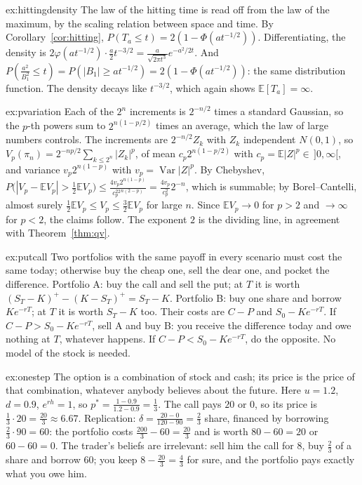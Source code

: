 \begin{solution}{ex:hittingdensity}
\idea The law of the hitting time is read off from the law of the maximum, by the scaling relation between space and
time.
\writeup By Corollary~\ref{cor:hitting}, $P(T_a\le t)=2(1-\Phi(at^{-1/2}))$. Differentiating, the density is $2\varphi(at^{-1/2})\cdot\frac a2t^{-3/2}=\frac a{\sqrt{2\pi t^3}}e^{-a^2/2t}$. And
$P(\frac{a^2}{B_1^2}\le t)=P(|B_1|\ge at^{-1/2})=2(1-\Phi(at^{-1/2}))$: the same distribution function. The density decays like $t^{-3/2}$, which again shows $\mathbb E[T_a]=\infty$.
\end{solution}

\begin{solution}{ex:pvariation}
\idea Each of the $2^n$ increments is $2^{-n/2}$ times a standard Gaussian, so the $p$-th powers sum to $2^{n(1-p/2)}$ times an average,
which the law of large numbers controls.
\writeup The increments are $2^{-n/2}Z_k$ with $Z_k$ independent $N(0,1)$, so $V_p(\pi_n)=2^{-np/2}\sum_{k\le2^n}|Z_k|^p$, of mean $c_p2^{n(1-p/2)}$ with $c_p=\mathbb E|Z|^p\in\,]0,\infty[$, and
variance $v_p2^{n(1-p)}$ with $v_p=\operatorname{Var}|Z|^p$. By Chebyshev, $P\bigl(|V_p-\mathbb E V_p|>\frac12\mathbb E V_p\bigr)\le\frac{4v_p2^{n(1-p)}}{c_p^22^{n(2-p)}}=\frac{4v_p}{c_p^2}2^{-n}$, which is summable; by
Borel--Cantelli, almost surely $\frac12\mathbb E V_p\le V_p\le\frac32\mathbb E V_p$ for large $n$. Since $\mathbb E V_p\to0$ for $p>2$ and $\to\infty$ for $p<2$, the claims follow. The exponent $2$ is
the dividing line, in agreement with Theorem~\ref{thm:qv}.
\end{solution}

\begin{solution}{ex:putcall}
\idea Two portfolios with the same payoff in every scenario must cost the same today; otherwise buy the cheap one, sell
the dear one, and pocket the difference.
\writeup Portfolio A: buy the call and sell the put; at $T$ it is worth $(S_T-K)^+-(K-S_T)^+=S_T-K$. Portfolio B: buy one share and borrow $Ke^{-rT}$; at $T$
it is worth $S_T-K$ too. Their costs are $C-P$ and $S_0-Ke^{-rT}$. If $C-P>S_0-Ke^{-rT}$, sell A and buy B: you receive the difference today and owe
nothing at $T$, whatever happens. If $C-P<S_0-Ke^{-rT}$, do the opposite. No model of the stock is needed.
\end{solution}

\begin{solution}{ex:onestep}
\idea The option is a combination of stock and cash; its price is the price of that combination, whatever anybody
believes about the future.
\writeup Here $u=1.2$, $d=0.9$, $e^{rh}=1$, so $p^*=\frac{1-0.9}{1.2-0.9}=\frac13$. The call pays $20$ or $0$, so its price is $\frac13\cdot20=\frac{20}3\approx6.67$. Replication: $\delta=\frac{20-0}{120-90}=\frac23$
share, financed by borrowing $\frac23\cdot90=60$: the portfolio costs $\frac{200}3-60=\frac{20}3$ and is worth $80-60=20$ or $60-60=0$. The trader's beliefs are irrelevant:
sell him the call for $8$, buy $\frac23$ of a share and borrow $60$; you keep $8-\frac{20}3=\frac43$ for sure, and the portfolio pays exactly what you owe him.
\end{solution}

